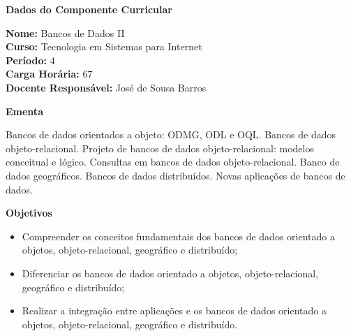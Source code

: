 

\begin{snugshade}\begin{center}\textbf{
	Dados do Componente Curricular
}\end{center}\end{snugshade}

\noindent 	\textbf{Nome:} Bancos de Dados II
\\ 			\textbf{Curso:} Tecnologia em Sistemas para Internet
\\ 			\textbf{Período:} \unit{4}{\degree}
\\ 			\textbf{Carga Horária:} \unit{67}{\hour}
\\ 			\textbf{Docente Responsável:} José de Sousa Barros 


\begin{snugshade}\begin{center}\textbf{
    Ementa
\vphantom{q}}\end{center}\end{snugshade}

\noindent
Bancos de dados orientados a objeto: ODMG, ODL e OQL. Bancos de dados objeto-relacional. Projeto de bancos de dados objeto-relacional: modelos conceitual e lógico. Consultas em bancos de dados objeto-relacional. Banco de dados geográficos. Bancos de dados distribuídos. Novas aplicações de bancos de dados.


\begin{snugshade}\begin{center}\textbf{
    Objetivos
}\end{center}\end{snugshade}


\begin{itemize}

\item Compreender os conceitos fundamentais dos bancos de dados orientado a objetos, objeto-relacional, geográfico e distribuído;
\item Diferenciar os bancos de dados orientado a objetos, objeto-relacional, geográfico e distribuído;
\item Realizar a integração entre aplicações e os bancos de dados orientado a objetos, objeto-relacional, geográfico e distribuído.

\end{itemize}


